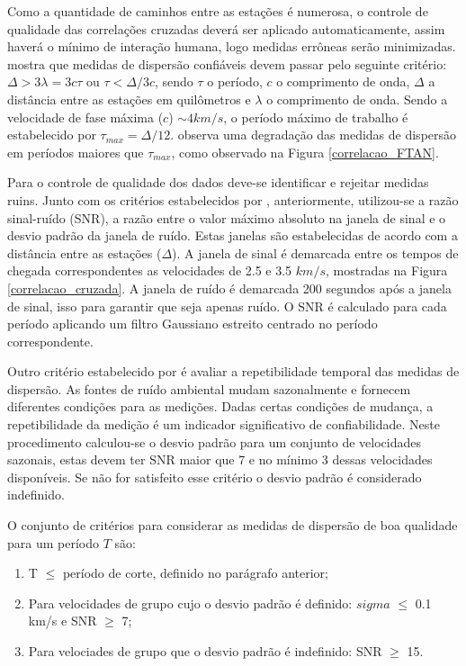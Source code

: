 Como a quantidade de caminhos entre as estações é numerosa, o controle de qualidade das correlações cruzadas deverá ser aplicado automaticamente, assim haverá o mínimo de interação humana, logo medidas errôneas serão minimizadas. \cite{bensen_processing_2007} mostra que medidas de dispersão confiáveis devem passar pelo seguinte critério: $\Delta > 3\lambda = 3c\tau$ ou $\tau < \Delta/3c$, sendo $\tau$ o período, $c$ o comprimento de onda, $\Delta$ a distância entre as estações em quilômetros e $\lambda$ o comprimento de onda. Sendo a velocidade de fase máxima ($c$) $\sim 4 km/s$, o período máximo de trabalho é estabelecido por $\tau_{max} = \Delta/12$. \cite{bensen_processing_2007} observa uma degradação das medidas de dispersão em períodos maiores que $\tau_{max}$, como observado na Figura \ref{correlacao_FTAN}. 

Para o controle de qualidade dos dados deve-se identificar e rejeitar medidas ruins. Junto com os critérios estabelecidos por \cite{bensen_processing_2007}, anteriormente, utilizou-se a razão sinal-ruído (SNR), a razão entre o valor máximo absoluto na janela de sinal e o desvio padrão da janela de ruído. Estas janelas são estabelecidas de acordo com a distância entre as estações ($\Delta$). A janela de sinal é demarcada entre os tempos de chegada correspondentes as velocidades de 2.5 e 3.5 $km/s$, mostradas na Figura \ref{correlacao_cruzada}. A janela de ruído é demarcada 200 segundos após a janela de sinal, isso para garantir que seja apenas ruído. O SNR é calculado para cada período aplicando um filtro Gaussiano estreito centrado no período correspondente.

Outro critério estabelecido por \cite{bensen_processing_2007} é avaliar a repetibilidade temporal das medidas de dispersão. As fontes de ruído ambiental mudam sazonalmente e fornecem diferentes condições para as medições. Dadas certas condições de mudança, a repetibilidade da medição é um indicador significativo de confiabilidade. Neste procedimento calculou-se o desvio padrão para um conjunto de velocidades sazonais, estas devem ter SNR maior que 7 e no mínimo 3 dessas velocidades disponíveis. Se não for satisfeito esse critério o desvio padrão é considerado indefinido.

O conjunto de critérios para considerar as medidas de dispersão de boa qualidade para um período $T$ são:

\begin{enumerate}
\item T $\leq$ período de corte, definido no parágrafo anterior;

\item Para velocidades de grupo cujo o desvio padrão é definido: $sigma$ $\leq$ 0.1 km/s e SNR $\geq$ 7;

\item Para velociades de grupo que o desvio padrão é indefinido: SNR $\geq$ 15.
\end{enumerate}

